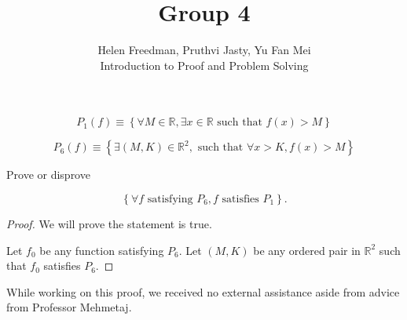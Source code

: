 \documentclass[12pt]{article}
\newenvironment{problem}[2][Problem]{\begin{trivlist}
\item[\hskip \labelsep {\bfseries #1}\hskip \labelsep {\bfseries #2.}]}{\end{trivlist}}
\begin{document}

\title{Group 4}%
\author{Helen Freedman, Pruthvi Jasty, Yu Fan Mei\\ %
	Introduction to Proof and Problem Solving} %
\maketitle

\begin{problem}{4a} %

    $$P_1 \left(f\right) \equiv \left\{ \forall M \in \mathbb{R}, \exists x \in \mathbb{R} \text{ such that } f(x) > M \right\}$$

    $$P_6 \left(f\right) \equiv \left\{ \exists (M, K) \in \mathbb{R}^2, \text{ such that } \forall x > K, f(x) > M \right\}$$

    Prove or disprove

    $$ \left\{ \forall f \text{ satisfying } P_6, f \text{ satisfies } P_1 \right\}. $$

\end{problem}

\begin{proof} We will prove the statement is true.

    Let $f_0$ be any function satisfying $P_6$. Let $\left(M, K\right)$ be any ordered pair in $\mathbb{R}^2$ such that $f_0$ satisfies $P_6$.



\end{proof}


\noindent While working on this proof, we received no external assistance aside from advice from Professor Mehmetaj.
\end{document}
